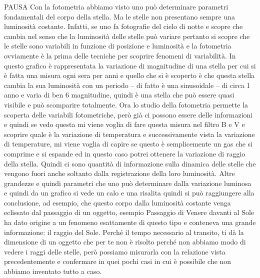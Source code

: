\documentclass[a4paper,11pt]{article}
\begin{document}
PAUSA
\newline
Con la fotometria abbiamo visto uno può determinare parametri fondamentali del corpo della stella. Ma le stelle non presentano sempre una luminosità costante. Infatti, se uno fa fotografie del cielo di notte e scopre che cambia nel senso che la luminosità delle stelle può variare pertanto si scopre che le stelle sono variabili in funzione di posizione e luminosità e la fotometria ovviamente è la prima delle tecniche per scoprire fenomeni di variabilità. 
\newline 
In questo grafico è rappresentata la variazione di magnitudine di una stella per cui si è fatta una misura ogni sera per anni e quello che si è scoperto  è che questa stella cambia la sua luminosità con un periodo – di fatto è una sinusoidale – di circa 1 anno e varia di ben 6 magnitudine, quindi è una stella che può essere quasi visibile e può scomparire totalmente. Ora lo studio della fotometria permette la scoperta delle variabili fotometriche, però già ci possono essere delle informazioni e quindi se vedo questa mi viene voglia di fare questa misura nel filtro B e V e scoprire quale è la variazione di temperatura e successivamente vista la variazione di temperature, mi viene voglia di capire se questo è semplicemente un gas che si comprime e si espande ed in questo caso potrei ottenere la variazione di raggio della stella. \newline
Quindi ci sono quantità di informazione sulla dinamica delle stelle che vengono fuori anche soltanto dalla registrazione della loro luminosità. Altre grandezze e quindi parametri che uno può determinare dalla variazione luminosa e quindi da un grafico si vede un calo e una risalita quindi si può raggiungere alla conclusione, ad esempio, che questo corpo dalla luminosità costante  venga eclissato dal passaggio di un oggetto, esempio Passaggio di Venere davanti al Sole ha dato origine a un fenomeno esattamente di questo tipo e conteneva una grande informazione: il raggio del Sole. Perché il tempo necessario al transito, ti dà la dimensione di un oggetto che per te non è risolto perché non abbiamo modo di vedere i raggi delle stelle, però possiamo misurarla con la relazione vista precedentemente e confermare in quei pochi casi in cui è possibile che non abbiamo inventato tutto a caso.
\end{document}
